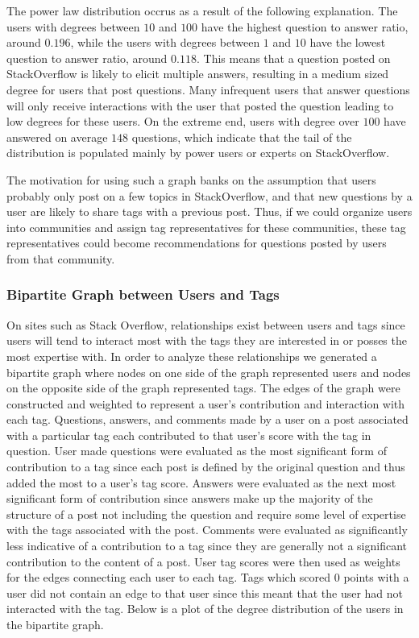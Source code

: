 \documentclass[11pt]{IEEEtran}
\begin{document}
The power law distribution occrus as a result of the following explanation. The users with degrees between $10$ and $100$ have the highest question to answer ratio, around $0.196$, while the users with degrees between $1$ and $10$ have the lowest question to answer ratio, around $0.118$. This means that a question posted on StackOverflow is likely to elicit multiple answers, resulting in a medium sized degree for users that post questions. Many infrequent users that answer questions will only receive interactions with the user that posted the question leading to low degrees for these users. On the extreme end, users with degree over $100$ have answered on average $148$ questions, which indicate that the tail of the distribution is populated mainly by power users or experts on StackOverflow.

The motivation for using such a graph banks on the assumption that users probably only post on a few topics in StackOverflow, and that new questions by a user are likely to share tags with a previous post. Thus, if we could organize users into communities and assign tag representatives for these communities, these tag representatives could become recommendations for questions posted by users from that community.


\subsubsection{Bipartite Graph between Users and Tags}

On sites such as Stack Overflow, relationships exist between users and tags since users will tend to interact most with the tags they are interested in or posses the most expertise with. In order to analyze these relationships we generated a bipartite graph where nodes on one side of the graph represented users and nodes on the opposite side of the graph represented tags. The edges of the graph were constructed and weighted to represent a user’s contribution and interaction with each tag. Questions, answers, and comments made by a user on a post associated with a particular tag each contributed to that user’s score with the tag in question. User made questions were evaluated as the most significant form of contribution to a tag since each post is defined by the original question and thus added the most to a user’s tag score. Answers were evaluated as the next most significant form of contribution since answers make up the majority of the structure of a post not including the question and require some level of expertise with the tags associated with the post. Comments were evaluated as significantly less indicative of a contribution to a tag since they are generally not a significant contribution to the content of a post. User tag scores were then used as weights for the edges connecting each user to each tag. Tags which scored 0 points with a user did not contain an edge to that user since this meant that the user had not interacted with the tag. Below is a plot of the degree distribution of the users in the bipartite graph.
\end{document}
